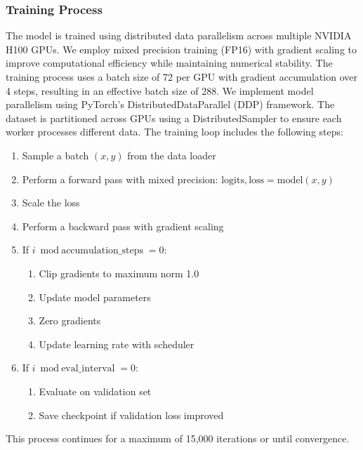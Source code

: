 \subsubsection{Training Process}
The model is trained using distributed data parallelism across multiple NVIDIA H100 GPUs. We employ mixed precision training (FP16) with gradient scaling to improve computational efficiency while maintaining numerical stability. The training process uses a batch size of 72 per GPU with gradient accumulation over 4 steps, resulting in an effective batch size of 288.
We implement model parallelism using PyTorch's DistributedDataParallel (DDP) framework. The dataset is partitioned across GPUs using a DistributedSampler to ensure each worker processes different data. The training loop includes the following steps:
\begin{enumerate}
    \item Sample a batch $(x, y)$ from the data loader
    \item Perform a forward pass with mixed precision: $\text{logits}, \text{loss} = \text{model}(x, y)$
    \item Scale the loss
    \item Perform a backward pass with gradient scaling
    \item If $i \bmod \text{accumulation_steps} = 0$:
    \begin{enumerate}
        \item Clip gradients to maximum norm 1.0
        \item Update model parameters
        \item Zero gradients
        \item Update learning rate with scheduler
    \end{enumerate}
    \item If $i \bmod \text{eval_interval} = 0$:
    \begin{enumerate}
        \item Evaluate on validation set
        \item Save checkpoint if validation loss improved
    \end{enumerate}
\end{enumerate}
\noindent This process continues for a maximum of 15,000 iterations or until convergence.
